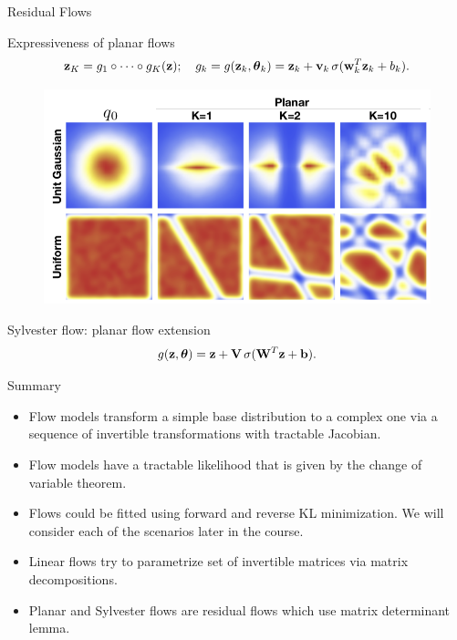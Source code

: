 \begin{frame}{Residual Flows}
	\begin{block}{Expressiveness of planar flows}
		\vspace{-0.5cm}
		\[
			\mathbf{z}_K = g_1 \circ \dots \circ g_K (\mathbf{z}); \quad g_k = g(\mathbf{z}_k, \boldsymbol{\theta}_k) = \mathbf{z}_k + \mathbf{v}_k\, \sigma(\mathbf{w}_k^T\mathbf{z}_k + b_k).
		\]
		\vspace{-0.8cm}
		\begin{figure}
			\centering
			\includegraphics[width=0.7\linewidth]{figs/planar_flows.png}
		\end{figure}
		\vspace{-0.5cm}
	\end{block}
	\begin{block}{Sylvester flow: planar flow extension}
		\vspace{-0.3cm}
		\[
		g(\mathbf{z}, \boldsymbol{\theta}) = \mathbf{z} + \mathbf{V} \, \sigma(\mathbf{W}^T\mathbf{z} + \mathbf{b}).
		\]
	\end{block}
\end{frame}
\begin{frame}{Summary}
	\begin{itemize}
		\item Flow models transform a simple base distribution to a complex one via a sequence of invertible transformations with tractable Jacobian.
		\vfill
		\item Flow models have a tractable likelihood that is given by the change of variable theorem.
		\vfill
		\item Flows could be fitted using forward and reverse KL minimization. We will consider each of the scenarios later in the course.
		\vfill 
		\item Linear flows try to parametrize set of invertible matrices via matrix decompositions.
		\vfill
		\item Planar and Sylvester flows are residual flows which use matrix determinant lemma. 
	\end{itemize}
\end{frame}
 